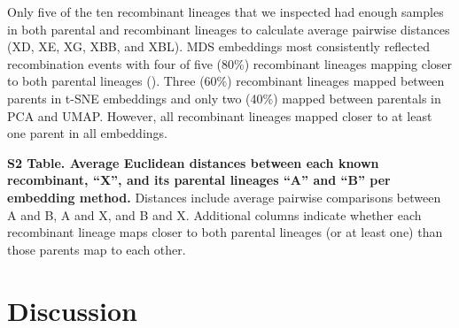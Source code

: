 \documentclass[10pt,letterpaper]{article}
\begin{document}
Only five of the ten recombinant lineages that we inspected had enough samples in both parental and recombinant lineages to calculate average pairwise distances (XD, XE, XG, XBB, and XBL).
MDS embeddings most consistently reflected recombination events with four of five (80\%) recombinant lineages mapping closer to both parental lineages ().
Three (60\%) recombinant lineages mapped between parents in t-SNE embeddings and only two (40\%) mapped between parentals in PCA and UMAP.
However, all recombinant lineages mapped closer to at least one parent in all embeddings.

\begin{table}[!ht]
\centering
\caption*{
  {\bf S2 Table. Average Euclidean distances between each known recombinant, ``X'', and its parental lineages ``A'' and ``B'' per embedding method.}
  Distances include average pairwise comparisons between A and B, A and X, and B and X.
  Additional columns indicate whether each recombinant lineage maps closer to both parental lineages (or at least one) than those parents map to each other.}
\scalebox{0.5}{
  
}
\end{table}

\section*{Discussion}
\end{document}
